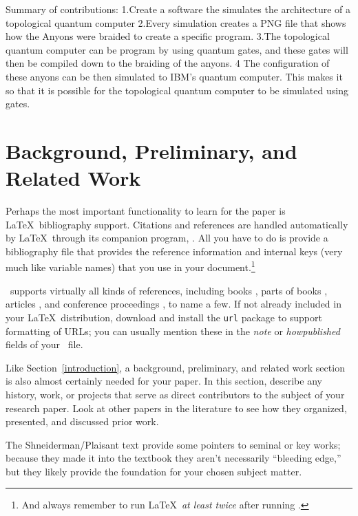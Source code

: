 \documentclass{article}
\begin{document}
Summary of contributions:
1.Create a software the simulates the architecture of a topological quantum computer
2.Every simulation creates a PNG file that shows how the Anyons were braided to create a specific program.
3.The topological quantum computer can be program by using quantum gates, and these gates will then be compiled down to the braiding of the anyons.
4 The configuration of these anyons can be then simulated to IBM's quantum computer. This makes it so that it is possible for the topological quantum computer to be simulated using gates.




\section{Background, Preliminary, and Related Work}

Perhaps the most important functionality to learn for the paper is \LaTeX\ bibliography support.  Citations and references are handled automatically by \LaTeX\ through its companion program, \BibTeX.  All you have to do is provide a bibliography file that provides the reference information and internal keys (very much like variable names) that you use in your document.\footnote{And always remember to run \LaTeX\ \emph{at least twice} after running \BibTeX.}

\BibTeX\ supports virtually all kinds of references, including books \cite{dui,sgg,iokit,palmos}, parts of books \cite{userModeLinux}, articles \cite{nielsen:dui-review,heer-shneiderman,stackableThreads,xpkernel}, and conference proceedings \cite{ux-3d,iring,contextFileSearch,osHaskell,hibernator}, to name a few.  If not already included in your \LaTeX\ distribution, download and install the \texttt{url} package to support formatting of URLs; you can usually mention these in the \emph{note} or \emph{howpublished} fields of your \BibTeX\ file.

Like Section~\ref{introduction}, a background, preliminary, and related work section is also almost certainly needed for your paper.  In this section, describe any history, work, or projects that serve as direct contributors to the subject of your research paper.  Look at other papers in the literature to see how they organized, presented, and discussed prior work.

The Shneiderman/Plaisant text \cite{dui} provide some pointers to seminal or key works; because they made it into the textbook they aren't necessarily ``bleeding edge,'' but they likely provide the foundation for your chosen subject matter.
\pagebreak
\end{document}
